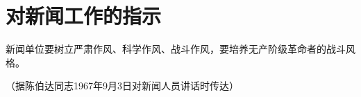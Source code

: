 \section[对新闻工作的指示（一九六七年九月）]{对新闻工作的指示}


新闻单位要树立严肃作风、科学作风、战斗作风，要培养无产阶级革命者的战斗风格。

{\raggedleft （据陈伯达同志1967年9月3日对新闻人员讲话时传达）\par}



